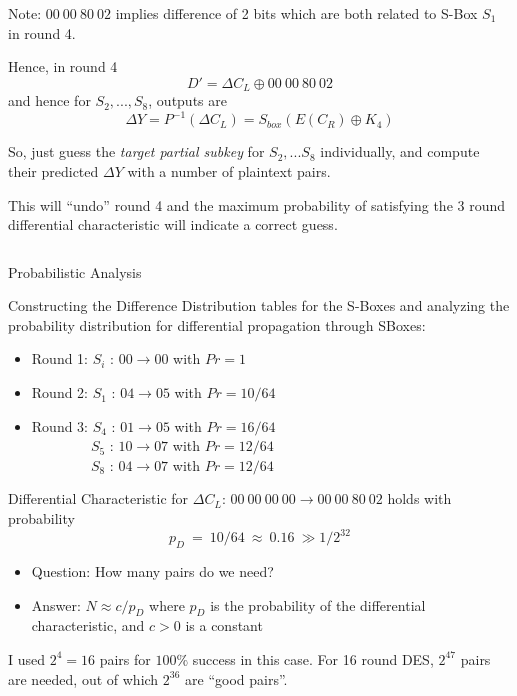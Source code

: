 \documentclass[9pt]{beamer}
\begin{document}
\begin{frame}
\begin{columns}
\begin{column}{0.6\textwidth}
\vspace{2mm}
\pause Note: $00\:00\:80\:02$ implies difference of 2 bits which are both related to S-Box $S_1$ in round 4.

\vspace{2mm}
\pause Hence, in round 4
\[ D' = \Delta C_L \oplus 00\:00\:80\:02 \]
\pause and hence for $S_2, ... , S_8$, outputs are
\[ \Delta Y = P^{-1}(\Delta C_L) = S_{box}(E(C_R) \oplus K_4) \]

\vspace{2mm}
So, just guess the {\it target partial subkey} for $S_2, ... S_8$ individually, \pause and compute their predicted $\Delta Y$ with a number of plaintext pairs. 

\vspace{2mm}
\pause This will ``undo'' round 4 and  the maximum probability of satisfying the 3 round differential characteristic will indicate a correct guess.
\end{column}
\end{columns}
\end{frame}


\begin{frame}
Probabilistic Analysis

\vspace{3mm}
Constructing the Difference Distribution tables for the S-Boxes and analyzing the probability distribution for differential propagation through SBoxes:

\vspace{2mm}
\pause
\begin{itemize}[<+->]
\item{Round 1: $S_i$ : $00 \rightarrow 00$ with $Pr = 1$}
\item{Round 2: $S_1$ : $04 \rightarrow 05$ with $Pr = 10/64$}
\item{Round 3: $S_4$ : $01 \rightarrow 05$  with $Pr = 16/64$ \\ $\qquad \qquad \: S_5$ : $10 \rightarrow 07$ with $Pr = 12/64$ \\ $\qquad \qquad \: S_8$ : $04 \rightarrow 07$ with $Pr = 12/64$}
\end{itemize}

\vspace{3mm}
\pause Differential Characteristic for $\Delta C_L$: $00\:00\:00\:00 \rightarrow 00\:00\:80\:02$ holds with probability
\[ p_D \: = \: 10/64 \: \approx \: 0.16 \: \gg 1/2^{32} \]

\vspace{2mm}
\pause
\begin{itemize}[<+->]
\item{Question: How many pairs do we need?}
\item{Answer: $N \approx c/p_D$ where $p_D$ is the probability of the differential characteristic, and $c > 0$ is a constant}
\end{itemize}
\pause I used $2^4 = 16$ pairs for $100\%$ success in this case. For 16 round DES, $2^{47}$ pairs are needed, out of which $2^{36}$ are ``good pairs''.
\end{frame}
\end{document}
